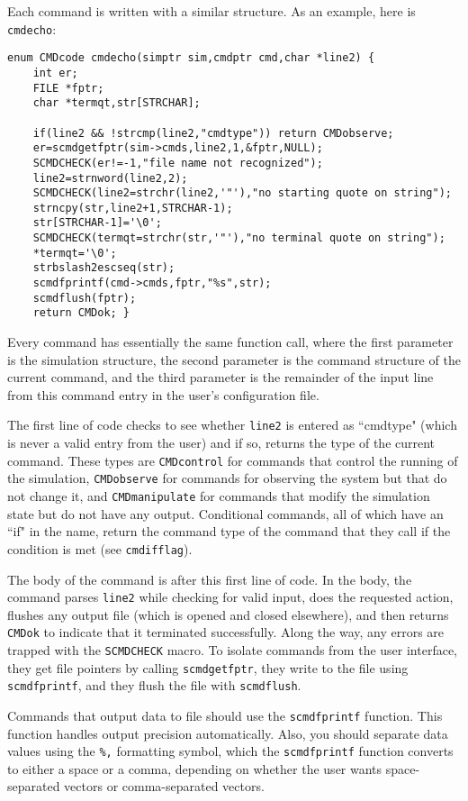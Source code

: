 \documentclass {scrbook}
\newcommand {\ttt} {\texttt}
\begin{document}
Each command is written with a similar structure. As an example, here is \ttt{cmdecho}:

\begin{lstlisting}
enum CMDcode cmdecho(simptr sim,cmdptr cmd,char *line2) {
	int er;
	FILE *fptr;
	char *termqt,str[STRCHAR];

	if(line2 && !strcmp(line2,"cmdtype")) return CMDobserve;
	er=scmdgetfptr(sim->cmds,line2,1,&fptr,NULL);
	SCMDCHECK(er!=-1,"file name not recognized");
	line2=strnword(line2,2);
	SCMDCHECK(line2=strchr(line2,'"'),"no starting quote on string");
	strncpy(str,line2+1,STRCHAR-1);
	str[STRCHAR-1]='\0';
	SCMDCHECK(termqt=strchr(str,'"'),"no terminal quote on string");
	*termqt='\0';
	strbslash2escseq(str);
	scmdfprintf(cmd->cmds,fptr,"%s",str);
	scmdflush(fptr);
	return CMDok; }
\end{lstlisting}

Every command has essentially the same function call, where the first parameter is the simulation structure, the second parameter is the command structure of the current command, and the third parameter is the remainder of the input line from this command entry in the user's configuration file.

The first line of code checks to see whether \ttt{line2} is entered as ``cmdtype" (which is never a valid entry from the user) and if so, returns the type of the current command. These types are \ttt{CMDcontrol} for commands that control the running of the simulation, \ttt{CMDobserve} for commands for observing the system but that do not change it, and \ttt{CMDmanipulate} for commands that modify the simulation state but do not have any output. Conditional commands, all of which have an ``if" in the name, return the command type of the command that they call if the condition is met (see \ttt{cmdifflag}).

The body of the command is after this first line of code. In the body, the command parses \ttt{line2} while checking for valid input, does the requested action, flushes any output file (which is opened and closed elsewhere), and then returns \ttt{CMDok} to indicate that it terminated successfully. Along the way, any errors are trapped with the \ttt{SCMDCHECK} macro. To isolate commands from the user interface, they get file pointers by calling \ttt{scmdgetfptr}, they write to the file using \ttt{scmdfprintf}, and they flush the file with \ttt{scmdflush}.

Commands that output data to file should use the \ttt{scmdfprintf} function. This function handles output precision automatically. Also, you should separate data values using the \ttt{\%,} formatting symbol, which the \ttt{scmdfprintf} function converts to either a space or a comma, depending on whether the user wants space-separated vectors or comma-separated vectors.
\end{document}
